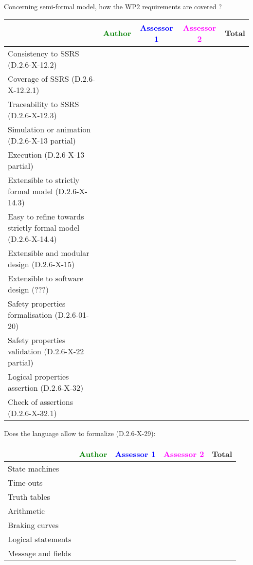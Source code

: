Concerning semi-formal model, how the WP2 requirements are covered ?

\begin{tabular}{|l | c | c | c | c|}
\hline
& \textcolor{green}{Author} & \textcolor{blue}{Assessor 1} & \textcolor{magenta}{Assessor 2} & Total \\
\hline 
Consistency to SSRS (D.2.6-X-12.2) & & & &  \\
\hline
Coverage of SSRS (D.2.6-X-12.2.1)  & & & &  \\
\hline
Traceability to  SSRS (D.2.6-X-12.3)  & & & &  \\
\hline
Simulation or animation (D.2.6-X-13 partial)  & & & &  \\
\hline
Execution (D.2.6-X-13 partial)  & & & &  \\
\hline
Extensible to strictly formal model (D.2.6-X-14.3) & & & &  \\
\hline
Easy to  refine towards strictly formal model (D.2.6-X-14.4) & & & &  \\
\hline
Extensible and modular design (D.2.6-X-15)  & & & &  \\
\hline
Extensible to software design (???)  & & & &  \\
\hline
Safety properties formalisation (D.2.6-01-20)  & & & &  \\
\hline
Safety properties validation (D.2.6-X-22 partial)  & & & &  \\
\hline
Logical properties assertion (D.2.6-X-32)  & & & &  \\
\hline
Check  of assertions (D.2.6-X-32.1)  & & & &  \\
\hline
\end{tabular}

Does the language allow to  formalize (D.2.6-X-29):

\begin{tabular}{|l | c | c | c | c|}
\hline
& \textcolor{green}{Author} & \textcolor{blue}{Assessor 1} & \textcolor{magenta}{Assessor 2} & Total \\
\hline 
State machines  & & & &  \\
\hline
Time-outs  & & & &  \\
\hline
Truth tables  & & & &  \\
\hline
Arithmetic  & & & &  \\
\hline
Braking curves  & & & &  \\
\hline
Logical statements & & & &  \\
\hline
Message and fields & & & &  \\
\hline
\end{tabular}

